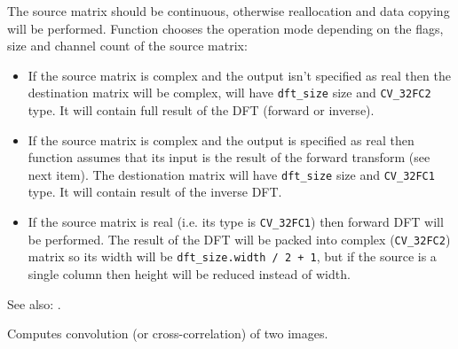 \begin{description}
\end{description}

The source matrix should be continuous, otherwise reallocation and data copying will be performed. Function chooses the operation mode depending on the flags, size and channel count of the source matrix:
\begin{itemize}
  \item If the source matrix is complex and the output isn't specified as real then the destination matrix will be complex, will have \texttt{dft\_size} size and \texttt{CV\_32FC2} type. It will contain full result of the DFT (forward or inverse).
  \item If the source matrix is complex and the output is specified as real then function assumes that its input is the result of the forward transform (see next item). The destionation matrix will have \texttt{dft\_size} size and \texttt{CV\_32FC1} type. It will contain result of the inverse DFT.
  \item If the source matrix is real (i.e. its type is \texttt{CV\_32FC1}) then forward DFT will be performed. The result of the DFT will be packed into complex (\texttt{CV\_32FC2}) matrix so its width will be \texttt{dft\_size.width / 2 + 1}, but if the source is a single column then height will be reduced instead of width.
\end{itemize}

See also: .


Computes convolution (or cross-correlation) of two images.


